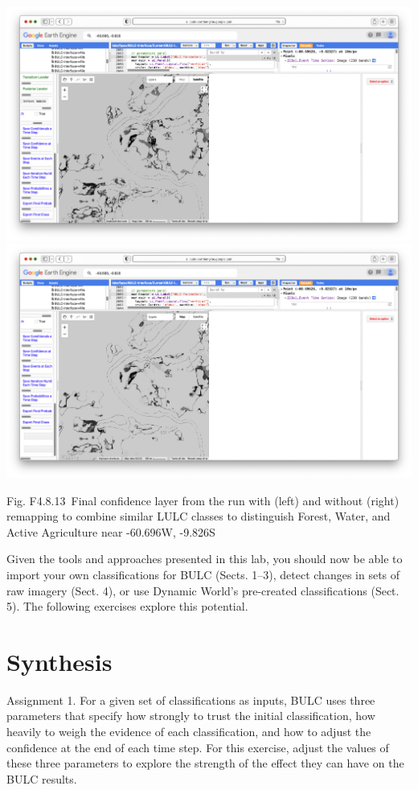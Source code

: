 \documentclass[
  letterpaper,
  DIV=11,
  numbers=noendperiod]{scrreprt}
\begin{document}
\includegraphics{./F4/image47.png}\includegraphics{./F4/image89.png}

Fig. F4.8.13~Final confidence layer from the run with (left) and without
(right) remapping to combine similar LULC classes to distinguish Forest,
Water, and Active Agriculture near -60.696W, -9.826S

Given the tools and approaches presented in this lab, you should now be
able to import your own classifications for BULC (Sects. 1--3), detect
changes in sets of raw imagery (Sect. 4), or use Dynamic World's
pre-created classifications (Sect. 5). The following exercises explore
this potential.

\hypertarget{synthesis-11}{%
\section*{Synthesis}\label{synthesis-11}}


Assignment 1. For a given set of classifications as inputs, BULC uses
three parameters that specify how strongly to trust the initial
classification, how heavily to weigh the evidence of each
classification, and how to adjust the confidence at the end of each time
step. For this exercise, adjust the values of these three parameters to
explore the strength of the effect they can have on the BULC results.
\end{document}
